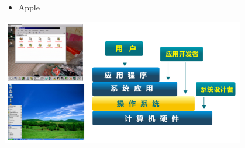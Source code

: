%
\begin{frame}[plain]	
	\frametitle{}

	
\end{frame}
\begin{frame}[plain]	
	\frametitle{}
	
\begin{itemize}\Large
	\item Apple

\end{itemize}

\centering
\includegraphics[width=0.8\textwidth]{os-position}
		
\end{frame}

